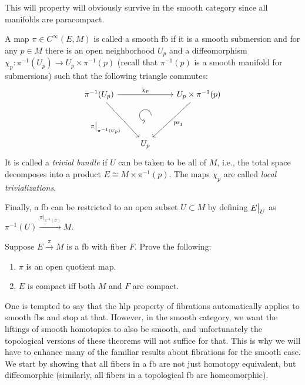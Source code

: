 This will property will obviously survive in the smooth category since all manifolds are paracompact.

\begin{defn}
    A map $\pi\in C^\infty(E,M)$ is called a smooth \gls{fb} if it is a smooth submersion and for any $p\in M$ there is an open neighborhood $U_p$ and a diffeomorphism $\chi_p:\pi^{-1}(U_p)\to U_p\times \pi^{-1}(p)$ (recall that $\pi^{-1}(p)$ is a smooth manifold for submersions) such that the following triangle commutes:
    \[
    \begin{tikzcd}[every matrix/.append style={name=m},   
    execute at end picture={\draw [<-] ([xshift=0mm,yshift=-2mm]m-2-2.north) arc[start angle=-90,delta angle=-270,radius=0.25cm];}]
       \pi^{-1}(U_p) \arrow[rr,"\chi_p"]\arrow[ddr,swap,"\restr{\pi}{\pi^{-1}(U_p)}"]& & U_p\times \pi^{-1}(p)\arrow[ddl,"\pr_1"]\\
       & \, & \\
       & U_p & 
    \end{tikzcd}
    \]
    It is called a \emph{trivial bundle} if $U$ can be taken to be all of $M$, i.e., the total space decomposes into a product $E\cong M\times \pi^{-1}(p)$. The maps $\chi_p$ are called \emph{local trivializations}.
    
    Finally, a \gls{fb} can be restricted to an open subset $U\subset M$ by defining $\restr{E}{U}$ as $\pi^{-1}(U)\overset{\pi|_{\pi^{-1}(U)}}{\longrightarrow}M$.
\end{defn}

\begin{xca}
    Suppose $E\overset{\pi}{\to}M$ is a \gls{fb} with fiber $F$. Prove the following:
    \begin{enumerate}[label=(\alph*)]
        \item $\pi$ is an open quotient map.
        \item $E$ is compact iff both $M$ and $F$ are compact.
    \end{enumerate}
\end{xca}


One is tempted to say that the \gls{hlp} property of fibrations automatically applies to smooth \glspl{fb} and stop at that.  However, in the smooth category, we want the liftings of smooth homotopies to also be smooth, and unfortunately the topological versions of these theorems will not suffice for that. This is why we will have to enhance many of the familiar results about fibrations for the smooth case. We start by showing that all fibers in a \gls{fb} are not just homotopy equivalent, but diffeomorphic (similarly, all fibers in a topological \gls{fb} are homeomorphic).

